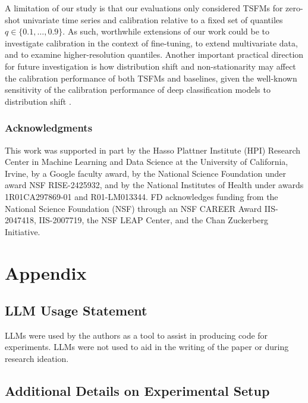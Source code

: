 \documentclass{article}
\begin{document}
A limitation of our study is that our evaluations only considered TSFMs for zero-shot univariate time series and calibration relative to a fixed set of quantiles $q \in \{0.1,\ldots,0.9\}$. 
As such, worthwhile extensions of our work could be to investigate calibration in the context of fine-tuning, to extend multivariate data, and to examine higher-resolution quantiles. 
Another important practical direction for future investigation is how distribution shift and non-stationarity may affect the calibration performance of both TSFMs and baselines, given the well-known sensitivity of the calibration performance of deep classification models to distribution shift \citep{ovadia2019can}.


\subsubsection*{Acknowledgments}
This work was supported in part by the Hasso Plattner Institute (HPI) Research Center in Machine Learning and Data Science at the University of California, Irvine, by a Google faculty award, by the National Science Foundation under award NSF RISE-2425932, and by the National Institutes of Health under awards 1R01CA297869-01 and R01-LM013344. 
FD acknowledges funding from the National Science Foundation (NSF) through an NSF CAREER Award IIS-2047418, IIS-2007719, the NSF LEAP Center, and the Chan Zuckerberg Initiative.

\newpage




\clearpage
\newpage
\appendix
\section{Appendix}\label{sec:appendix}

\subsection{LLM Usage Statement}
LLMs were used by the authors as a tool to assist in producing code for experiments. 
LLMs were not used to aid in the writing of the paper or during research ideation.

\subsection{Additional Details on Experimental Setup}\label{sec:appendix:setup}
\end{document}

